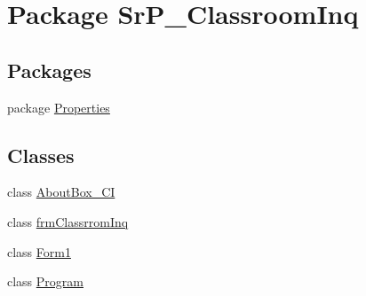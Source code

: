 \hypertarget{namespace_sr_p___classroom_inq}{
\section{\-Package \-Sr\-P\-\_\-\-Classroom\-Inq}
\label{namespace_sr_p___classroom_inq}
}
\subsection*{\-Packages}
\begin{DoxyCompactItemize}
\item 
package \hyperlink{namespace_sr_p___classroom_inq_1_1_properties}{\-Properties}
\end{DoxyCompactItemize}
\subsection*{\-Classes}
\begin{DoxyCompactItemize}
\item 
class \hyperlink{class_sr_p___classroom_inq_1_1_about_box___c_i}{\-About\-Box\-\_\-\-C\-I}
\item 
class \hyperlink{class_sr_p___classroom_inq_1_1frm_classrrom_inq}{frm\-Classrrom\-Inq}
\item 
class \hyperlink{class_sr_p___classroom_inq_1_1_form1}{\-Form1}
\item 
class \hyperlink{class_sr_p___classroom_inq_1_1_program}{\-Program}
\end{DoxyCompactItemize}

